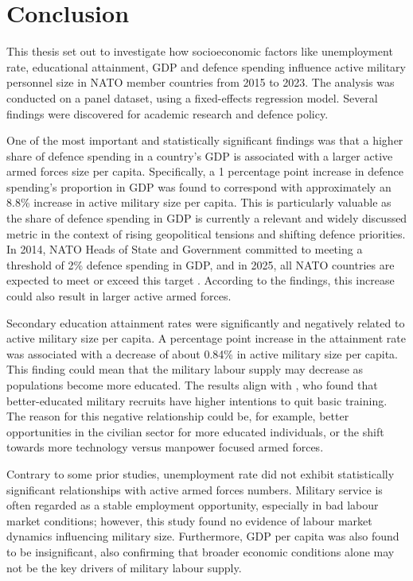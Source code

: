 \chapter{Conclusion}

This thesis set out to investigate how socioeconomic factors like unemployment rate, educational 
attainment, GDP and defence spending influence active military personnel size in NATO member countries 
from 2015 to 2023. The analysis was conducted on a panel dataset, using a fixed-effects regression model.
Several findings were discovered for academic research and defence policy.

One of the most important and statistically significant findings was that a higher share of defence 
spending in a country's GDP is associated with a larger active armed forces size per capita. Specifically, 
a 1 percentage point increase in defence spending's proportion in GDP was found to correspond with 
approximately an 8.8\% increase in active military size per capita.
This is particularly valuable as the share of defence spending in GDP is currently a relevant and 
widely discussed metric in the context of rising geopolitical tensions and shifting defence priorities.
In 2014, NATO Heads of State and Government committed to meeting a threshold of 2\% defence spending in GDP, and in 2025, all NATO countries are expected to meet or exceed this target \parencite{nato_defence_2025}. 
According to the findings, this increase could also result in larger active armed forces.

Secondary education attainment rates were significantly and negatively related to active military 
size per capita. A percentage point increase in the attainment rate was associated with a decrease 
of about 0.84\% in active military size per capita. This finding could mean that the military labour 
supply may decrease as populations become more educated. The results align with \textcite{hof_quality_2023}, 
who found that better-educated military recruits have higher intentions to quit basic training.
The reason for this negative relationship could be, for example, better opportunities in the civilian 
sector for more educated individuals, or the shift towards more technology versus manpower focused 
armed forces.

Contrary to some prior studies, unemployment rate did not exhibit statistically significant 
relationships with active armed forces numbers. Military service is often regarded as a stable
employment opportunity, especially in bad labour market conditions; however, this study found 
no evidence of labour market dynamics influencing military size. Furthermore, GDP per capita was 
also found to be insignificant, also confirming that broader economic conditions alone may not be the 
key drivers of military labour supply.

